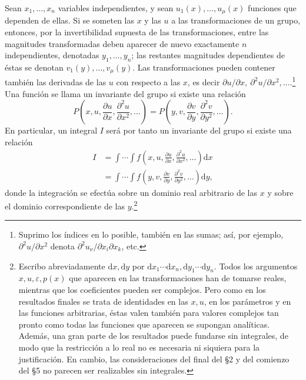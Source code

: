 \documentclass[11pt]{article}
\newcommand{\eps}{\varepsilon}
\providecommand{\dd}{\mathrm d}
\providecommand{\p}{\partial}
\begin{document}
Sean \(x_1,\ldots,x_n\) variables independientes, y sean \(u_1(x),\ldots,u_\mu(x)\) funciones que dependen de ellas. Si se someten las \(x\) y las \(u\) a las transformaciones de un grupo, entonces, por la invertibilidad supuesta de las transformaciones, entre las magnitudes transformadas deben aparecer de nuevo exactamente \(n\) independientes, denotadas \(y_1,\ldots,y_n\); las restantes magnitudes dependientes de éstas se denotan \(v_1(y),\ldots,v_\mu(y)\). Las transformaciones pueden contener también las derivadas de las \(u\) con respecto a las \(x\), es decir \(\p u/\p x,\ \p^2u/\p x^2,\ldots\).\footnote{Suprimo los índices en lo posible, también en las sumas; así, por ejemplo, \(\p^2u/\p x^2\) denota \(\p^2u_\nu/\p x_i\p x_k\), etc.} Una función se llama un invariante del grupo si existe una relación
\[
P\!\left(x,u,\frac{\p u}{\p x},\frac{\p^2u}{\p x^2},\ldots\right)
 =
P\!\left(y,v,\frac{\p v}{\p y},\frac{\p^2v}{\p y^2},\ldots\right).
\]
En particular, un integral \(I\) será por tanto un invariante del grupo si existe una relación
\begin{equation}
\begin{aligned}
I&=\int\!\cdots\!\int f\!\left(x,u,\frac{\p u}{\p x},\frac{\p^2u}{\p x^2},\ldots\right)\dd x\\
 &=\int\!\cdots\!\int f\!\left(y,v,\frac{\p v}{\p y},\frac{\p^2v}{\p y^2},\ldots\right)\dd y,
\end{aligned}
\tag{1}
\end{equation}
donde la integración se efectúa sobre un dominio real arbitrario de las \(x\) y sobre el dominio correspondiente de las \(y\).\footnote{Escribo abreviadamente \(\dd x,\dd y\) por \(\dd x_1\cdots \dd x_n,\dd y_1\cdots \dd y_n\). Todos los argumentos \(x,u,\eps,p(x)\) que aparecen en las transformaciones han de tomarse reales, mientras que los coeficientes pueden ser complejos. Pero como en los resultados finales se trata de identidades en las \(x,u\), en los parámetros y en las funciones arbitrarias, éstas valen también para valores complejos tan pronto como todas las funciones que aparecen se supongan analíticas. Además, una gran parte de los resultados puede fundarse sin integrales, de modo que la restricción a lo real no es necesaria ni siquiera para la justificación. En cambio, las consideraciones del final del \S{}2 y del comienzo del \S{}5 no parecen ser realizables sin integrales.}
\end{document}
